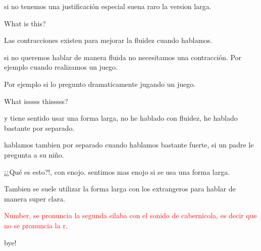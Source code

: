 si no tenemos una justificación especial suena raro la version larga.

What is this?

Las contracciones existen para mejorar la fluidez cuando hablamos.

si no queremos hablar de manera fluida no necesitamos una contracción.
Por ejemplo cuando realizamos un juego.

Por ejemplo si lo pregunto dramaticamente jugando un juego.

What isssss thisssss?

y tiene sentido usar una forma larga, no he hablado con fluidez, he hablado
bastante por separado.

hablamos tambien por separado cuando hablamos bastante fuerte, si un padre
le pregunta a su niño.

¡¿Qué es esto?!, con enojo. sentimos mas enojo si se usa una forma larga.

Tambien se suele utilizar la forma larga con los extrangeros para hablar
de manera super clara.

\textcolor{red}{Number, se pronuncia la segunda silaba con el sonido de
cabernicola, es decir que no se pronuncia la r.}

bye!

